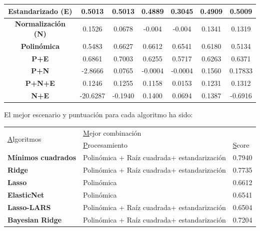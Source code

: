 \documentclass[12pt,a4paper]{article}
\begin{document}
\begin{table}[H]
\begin{tabular}{|c|c|c|c|c|c|c|}
		\textbf{Estandarizado (E)}                                           & 0.5013   & 0.5013      & 0.4889      & 0.3045           & 0.4909           & 0.5009               \\ \hline
		\textbf{Normalización (N)}                                           & 0.1526   & 0.0678      & -0.004      & -0.004           & 0.1341           & 0.1319               \\ \hline
		\textbf{Polinómica}                                                  & 0.5483   & 0.6627      & 0.6612      & 0.6541           & 0.6180           & 0.5134               \\ \hline
		\textbf{P+E}                                                         & 0.6861   & 0.7003      & 0.6255      & 0.5717           & 0.6263           & 0.6371               \\ \hline
		\textbf{P+N}                                                         & -2.8666  & 0.0765      & -0.0004     & -0.0004          & 0.1560           & 0.17833              \\ \hline
		\textbf{P+N+E}                                                       & 0.1246   & 0.1255      & 0.1158      & 0.0153           & 0.1231           & 0.1312               \\ \hline
		\textbf{N+E}                                                         & -20.6287 & -0.1940     & 0.1400      & 0.0694           & 0.1387           & -0.6916              \\ \hline
	\end{tabular}
\end{table}

El mejor escenario y puntuación para cada algoritmo ha sido:

\begin{table}[H]
	\begin{tabular}{|l|l|l|}
		\hline
		\multirow{2}{*}{{\ul Algoritmos}} & \multicolumn{2}{l|}{{\ul Mejor combinación}}              \\ \cline{2-3} 
		& {\ul Procesamiento}                         & {\ul Score} \\ \hline
		\textbf{Mínimos cuadrados}        & Polinómica + Raíz cuadrada+ estandarización & 0.7940      \\ \hline
		\textbf{Ridge}                    & Polinómica + Raíz cuadrada+ estandarización & 0.7735      \\ \hline
		\textbf{Lasso}                    & Polinómica                                  & 0.6612      \\ \hline
		\textbf{ElasticNet}               & Polinómica                                  & 0.6541      \\ \hline
		\textbf{Lasso-LARS}               & Polinómica + Raíz cuadrada+ estandarización & 0.6504      \\ \hline
		\textbf{Bayesian Ridge}           & Polinómica + Raíz cuadrada+ estandarización & 0.7204      \\ \hline
	\end{tabular}
\end{table}
\end{document}
